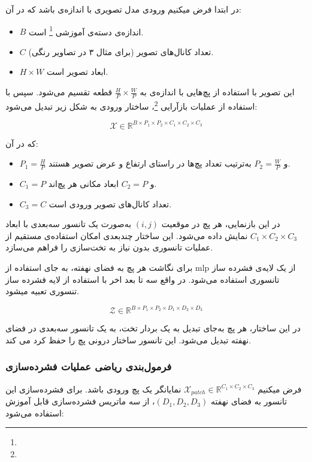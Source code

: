 در ابتدا فرض میکنیم  ورودی مدل تصویری با اندازه‌ی  باشد که در آن:

\begin{itemize}
	\item $B$ اندازه‌ی دسته‌ی آموزشی \footnote{} است.
	\item $C$ تعداد کانال‌های تصویر (برای مثال ۳ در تصاویر رنگی).
	\item $H \times W$ ابعاد تصویر است.
\end{itemize}

این تصویر با استفاده از پچ‌هایی با اندازه‌ی  به $\frac{H}{P} \times \frac{W}{P}$ قطعه تقسیم می‌شود. سپس با استفاده از عملیات بازآرایی \footnote{}، ساختار ورودی به شکل زیر تبدیل می‌شود:

\[
\mathcal{X} \in \mathbb{R}^{B \times P_1 \times P_2 \times C_1 \times C_2 \times C_3}
\]

که در آن:

\begin{itemize}
	\item $P_1 = \frac{H}{P}$ و $P_2 = \frac{W}{P}$ به‌ترتیب تعداد پچ‌ها در راستای ارتفاع و عرض تصویر هستند.
	\item $C_1 = P$ و $C_2 = P$ ابعاد مکانی هر پچ‌اند.
	\item $C_3 = C$ تعداد کانال‌های تصویر ورودی است.
\end{itemize}

در این بازنمایی، هر پچ در موقعیت $(i,j)$ به‌صورت یک تانسور سه‌بعدی با ابعاد $C_1 \times C_2 \times C_3$ نمایش داده می‌شود. این ساختار چندبعدی امکان استفاده‌ی مستقیم از عملیات تانسوری بدون نیاز به تخت‌سازی را فراهم می‌سازد.



برای نگاشت هر پچ به فضای نهفته، به جای استفاده از mlp  از یک لایه‌ی فشرده ساز تانسوری  استفاده می‌شود. در واقع سه تا بعد اخر با استفاده از لایه فشرده ساز تنسوری تعبیه میشود.

\[
\mathcal{Z} \in \mathbb{R}^{B \times P_1 \times P_2 \times D_1 \times D_2 \times D_3}
\]

در این ساختار، هر پچ به‌جای تبدیل به یک بردار تخت، به یک تانسور سه‌بعدی در فضای نهفته تبدیل می‌شود. این تانسور ساختار درونی پچ را حفظ کرد می کند. 

\subsubsection*{فرمول‌بندی ریاضی عملیات فشرده‌سازی}

فرض میکنیم  $\mathcal{X}_{patch} \in \mathbb{R}^{C_1 \times C_2 \times C_3}$ نمایانگر یک پچ ورودی باشد. برای فشرده‌سازی این تانسور به فضای نهفته $(D_1, D_2, D_3)$، از سه ماتریس فشرده‌سازی قابل آموزش استفاده می‌شود:

